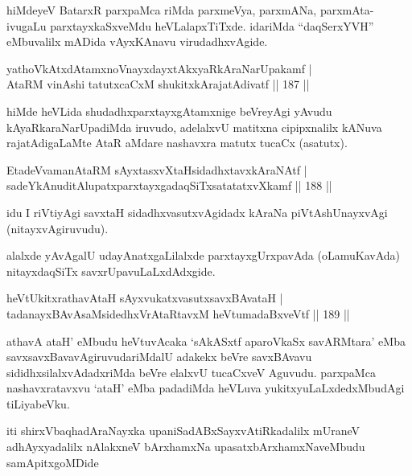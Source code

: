 \begin{artha}
hiMdeyeV BatarxR parxpaMca riMda parxmeVya, parxmANa, parxmAta- ivugaLu parxtayxkaSxveMdu heVLalapxTiTxde. idariMda ``daqSerxYVH'' eMbuvalilx mADida vAyxKAnavu virudadhxvAgide.
\end{artha}

\begin{shl}
yathoVkAtxdAtamxnoV\s nayxdayxtAkxyaRkAraNarUpakamf |\\
AtaRM vinAshi tatutxcaCxM shukitxkArajatAdivatf \hfill || 187 ||
\end{shl}

\begin{artha}
hiMde heVLida shudadhxparxtayxgAtamxnige beVreyAgi yAvudu kAyaRkaraNarUpadiMda iruvudo, adelalxvU matitxna cipipxnalilx kANuva rajatAdigaLaMte AtaR aMdare nashavxra matutx tucaCx (asatutx).
\end{artha}

\begin{shl}
EtadeVvamanAtaRM sAyxtasxvXtaHsidadhxtavxkAraNAtf |\\
sadeYkAnuditAlupatxparxtayxgadaqSiTxsatatatxvXkamf \hfill || 188 ||
\end{shl}

\begin{artha}
idu I riVtiyAgi savxtaH sidadhxvasutxvAgidadx kAraNa piVtAshUnayxvAgi (nitayxvAgiruvudu).

alalxde yAvAgalU udayAnatxgaLilalxde parxtayxgUrxpavAda (oLamuKavAda) nitayxdaqSiTx savxrUpavuLaLxdAdxgide.
\end{artha}


\begin{shl}
heVtUkitxrathavA\s taH sAyxvukatxvasutxsavxBAvataH |\\
tadanayxBAvAsaMsidedhxVrAtaRtavxM heVtumadaBxveVtf \hfill || 189 ||
\end{shl}

\begin{artha}
athavA ataH' eMbudu heVtuvAcaka `sAkASxtf aparoVkaSx savARMtara' eMba savxsavxBavavAgiruvudariMdalU adakekx beVre savxBAvavu sididhxsilalxvAdadxriMda beVre elalxvU tucaCxveV Aguvudu. parxpaMca nashavxratavxvu `ataH' eMba padadiMda heVLuva yukitxyuLaLxdedxMbudAgi tiLiyabeVku.
\end{artha}

\begin{center}
iti shirxVbaqhadAraNayxka upaniSadABxSayxvAtiRkadalilx mUraneV adhAyxyadalilx nAlakxneV bArxhamxNa upasatxbArxhamxNaveMbudu samApitxgoMDide 

\end{center}
